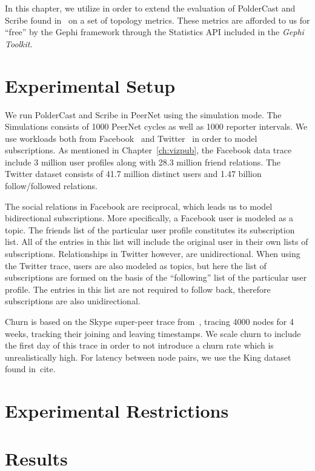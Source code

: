 In this chapter, we utilize \demo{} in order to extend the evaluation of
PolderCast and Scribe found in~\cite{Setty:2012} on a set of topology
metrics. These metrics are afforded to us for ``free'' by the Gephi
framework through the Statistics API included in the \emph{Gephi
    Toolkit}.

\section{Experimental Setup}

We run PolderCast and Scribe in PeerNet using the simulation mode. The
Simulations consists of 1000 PeerNet cycles as well as 1000 reporter
intervals. We use workloads both from Facebook~\cite{} and
Twitter~\cite{} in order to model subscriptions. As mentioned in
Chapter~\ref{ch:vizpub}, the Facebook data trace include 3 million user
profiles along with 28.3 million friend relations. The Twitter dataset
consists of 41.7 million distinct users and 1.47 billion
follow/followed relations.

The social relations in Facebook are reciprocal, which leads us to model
bidirectional subscriptions. More specifically, a Facebook user is
modeled as a topic. The friends list of the particular user profile
constitutes its subscription list. All of the entries in this list will
include the original user in their own lists of subscriptions.
Relationships in Twitter however, are unidirectional. When using the
Twitter trace, users are also modeled as topics, but here the list of
subscriptions are formed on the basis of the ``following'' list of the
particular  user profile. The entries in this list are not required to
follow back, therefore subscriptions are also unidirectional.

Churn is based on the Skype super-peer trace from~\cite{}, tracing 4000
nodes for 4 weeks, tracking their joining and leaving timestamps. We
scale churn to include the first day of this trace in order to not
introduce a churn rate which is unrealistically high. For latency
between node pairs, we use the King dataset found in~cite{}.

\section{Experimental Restrictions}

\section{Results}

%     
